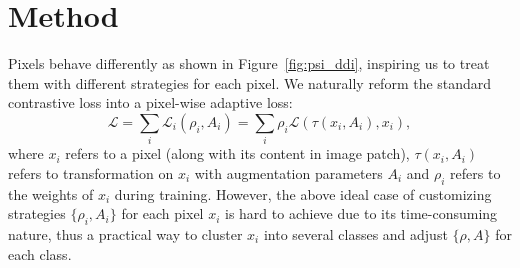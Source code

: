 \documentclass[10pt,twocolumn,letterpaper]{article}
\begin{document}
\section{Method}
Pixels behave differently as shown in Figure~\ref{fig:psi_ddi}, inspiring us to treat them with different strategies for each pixel. We naturally reform the standard contrastive loss into a pixel-wise adaptive loss:
\begin{equation}
    \mathcal{L} = \sum_i \mathcal{L}_i(\rho_i, A_i) = \sum_i \rho_i \mathcal{L}(\tau(x_i, A_i), x_i),
\end{equation}
where $x_i$ refers to a pixel (along with its content in image patch), $\tau(x_i, A_i)$ refers to transformation on $x_i$ with augmentation parameters $A_i$ and $\rho_i$ refers to the weights of $x_i$ during training. However, the above ideal case of customizing strategies $\{\rho_i, A_i\}$ for each pixel $x_i$ is hard to achieve due to its time-consuming nature, thus a practical way to cluster $x_i$ into several classes and adjust $\{\rho, A \}$ for each class. 
\end{document}
